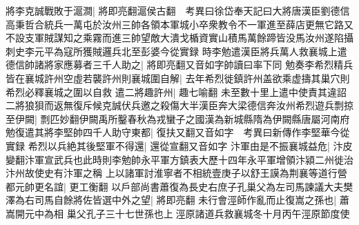 將李克誠戰敗于滬澗|{
	將即亮翻滬侯古翻　考異曰徐岱奉天記曰大將唐漢臣劉德信高秉哲合統兵一萬屯於汝州三帥各領本軍城小卒衆教令不一軍進至薛店更無它路又不設支軍賊謀知之乘霧而進三帥望敵大潰戈楯資實山積馬萬餘蹄皆没馬汝州遂陷攝刺史李元平為寇所獲賊邏兵北至彭婆今從實録}
時李勉遣漢臣將兵萬人救襄城上遣德信帥諸將家應募者三千人助之|{
	將即亮翻又音如字帥讀曰率下同}
勉奏李希烈精兵皆在襄城許州空虛若襲許州則襄城圍自解|{
	去年希烈徙鎮許州盖欲乘虚擣其巢穴則希烈必釋襄城之圍以自救}
遣二將趣許州|{
	趣七喻翻}
未至數十里上遣中使責其違詔二將狼狽而返無復斥候克誠伏兵邀之殺傷大半漢臣奔大梁德信奔汝州希烈遊兵剽掠至伊闕|{
	剽匹妙翻伊闕禹所鑿春秋為戎蠻子之國漢為新城縣隋為伊闕縣唐屬河南府}
勉復遣其將李堅帥四千人助守東都|{
	復扶又翻又音如字　考異曰新傳作李堅華今從實録}
希烈以兵絶其後堅軍不得還|{
	還從宣翻又音如字}
汴軍由是不振襄城益危|{
	汴皮變翻汴軍宣武兵也此時則李勉帥永平軍方鎮表大歷十四年永平軍增領汴潁二州徙治汴州故使史有汴軍之稱}
上以諸軍討淮寧者不相統壹庚子以舒王謨為荆襄等道行營都元帥更名誼|{
	更工衡翻}
以戶部尚書蕭復為長史右庶子孔巢父為左司馬諫議大夫樊澤為右司馬自餘將佐皆選中外之望|{
	將即亮翻}
未行會涇師作亂而止復嵩之孫也|{
	蕭嵩開元中為相}
巢父孔子三十七世孫也上涇原諸道兵救襄城冬十月丙午涇原節度使

